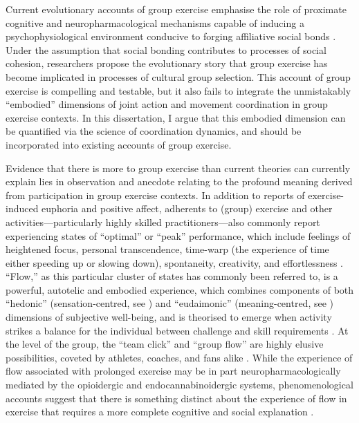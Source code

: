 Current evolutionary accounts of group exercise emphasise the role of proximate cognitive and neuropharmacological mechanisms capable of inducing a psychophysiological environment conducive to forging affiliative social bonds \citep{Dunbar2010,Cohen2017}. Under the assumption that social bonding contributes to processes of social cohesion, researchers propose the evolutionary story that group exercise has become implicated in processes of cultural group selection.  This account of group exercise is compelling and testable, but it also fails to integrate the unmistakably ``embodied'' dimensions of joint action and movement coordination in group exercise contexts.  In this dissertation, I argue that this embodied dimension can be quantified via the science of coordination dynamics, and should be incorporated into existing accounts of group exercise.

Evidence that there is more to group exercise than current theories can currently explain lies in observation and anecdote relating to the profound meaning derived from participation in group exercise contexts.  In addition to reports of exercise-induced euphoria and positive affect, adherents to (group) exercise and other activities---particularly highly skilled practitioners---also commonly report experiencing states of ``optimal'' or ``peak'' performance, which include feelings of heightened focus, personal transcendence, time-warp (the experience of time either speeding up or slowing down), spontaneity, creativity, and effortlessness \citep{Jackson1995a}.  ``Flow,'' as this particular cluster of states has commonly been referred to, is a powerful, autotelic and embodied experience, which combines components of both ``hedonic'' (sensation-centred, see \citep{Huta2010}) and ``eudaimonic'' (meaning-centred, see \cite{Ryff1989,Ryff2015}) dimensions of subjective well-being, and is theorised to emerge when activity strikes a balance for the individual between challenge and skill requirements \citep{Csikszentmihalyi1990,Abuhamdeh2012}.  At the level of the group, the ``team click'' and ``group flow'' are highly elusive possibilities, coveted by athletes, coaches, and fans alike \citep{Novak1993,Sawyer2006}.  While the experience of flow associated with prolonged exercise may be in part neuropharmacologically mediated by the opioidergic and endocannabinoidergic systems, phenomenological accounts suggest that there is something distinct about the experience of flow in exercise that requires a more complete cognitive and social explanation \citep{Dietrich2006,Dietrich2011}.


